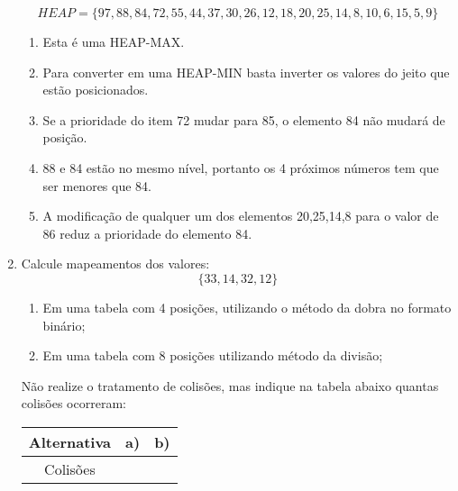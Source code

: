 \documentclass[11pt]{article}
\begin{document}
\begin{enumerate}[label=\textbf{Q\arabic*}]
          $$HEAP = \{97, 88, 84, 72, 55, 44, 37, 30, 26, 12, 18, 20, 25, 14, 8, 10, 6, 15, 5, 9\}$$
          \begin{enumerate}
              \item Esta é uma HEAP-MAX.
              \item Para converter em uma HEAP-MIN basta inverter os valores do jeito que estão posicionados.
              \item Se a prioridade do item 72 mudar para 85, o elemento 84 não mudará de posição.
              \item 88 e 84 estão no mesmo nível, portanto os 4 próximos números tem que ser menores que 84.
              \item A modificação de qualquer um dos elementos 20,25,14,8 para o valor de 86 reduz a prioridade do elemento 84.
          \end{enumerate}

    \item Calcule mapeamentos dos valores:
          $$\{33,14,32,12\}$$
          \begin{enumerate}
              \item Em uma tabela com 4 posições, utilizando o método da dobra no formato binário;
              \item Em uma tabela com 8 posições utilizando método da divisão;
          \end{enumerate}
          Não realize o tratamento de colisões, mas indique na tabela abaixo quantas colisões ocorreram:
          \begin{center}
              \begin{tabular}{|c|c|c|}
                  \hline
                  Alternativa & a) & b) \\
                  \hline
                  Colisões    & \  & \  \\
                  \hline
              \end{tabular}
          \end{center}
\end{enumerate}
\end{document}
